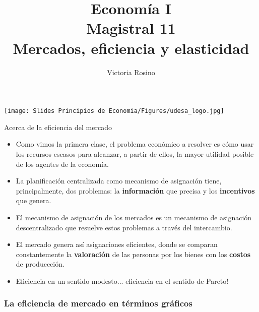 \documentclass{beamer}
\title[Economía I]{Economía I \vspace{3mm}
\\ Magistral 11 \vspace{3mm} \\ Mercados, eficiencia y elasticidad}
\date{}
\author[Victoria Rosino]{Victoria Rosino}
\institute[]{Universidad de San Andrés}
\begin{document}
\begin{frame}
\vspace{0.3cm}
\titlepage
\centering
\vspace{-0.9cm}
\texttt{[image: Slides Principios de Economia/Figures/udesa\_logo.jpg]} 
\end{frame}


\begin{frame}{Acerca de la eficiencia del mercado}
    \begin{itemize}
      \item Como vimos la primera clase, el problema económico a resolver es cómo usar los recursos escasos para alcanzar, a partir de ellos, la mayor utilidad posible de los agentes de la economía.
      \item La planificación centralizada como mecanismo de asignación tiene, principalmente, dos problemas: la \textbf{información} que precisa y los \textbf{incentivos} que genera.
      \item El mecanismo de asignación de los mercados es un mecanismo de asignación descentralizado que resuelve estos problemas a través del intercambio.
      \item El mercado genera así asignaciones eficientes, donde se comparan constantemente la \textbf{valoración} de las personas por los bienes con los \textbf{costos} de produccción.
      \item Eficiencia en un sentido modesto... eficiencia en el sentido de Pareto!
    \end{itemize}
\end{frame}

\begin{frame}
\frametitle{La eficiencia de mercado en términos gráficos}
    \begin{figure}[H]
    \begin{center}
    \end{center}
    \end{figure}
\end{frame}
\end{document}

